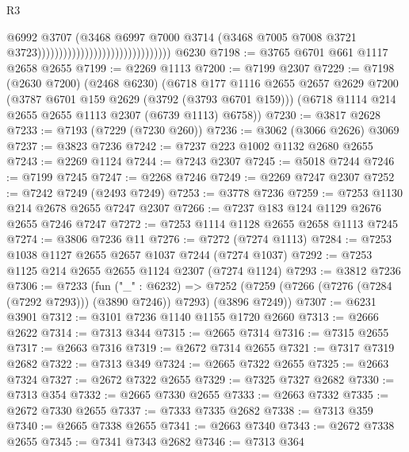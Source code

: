 \begin{lexlean}{R3}
\begin{coremodule}
                                                              @6992
                                                              @3707
                                                              (@3468
                                                                @6997
                                                                @7000
                                                                @3714
                                                                (@3468
                                                                  @7005
                                                                  @7008
                                                                  @3721
                                                                  @3723)))))))))))))))))))))))))))))))
    @6230
@7198 := @3765 @6701 @661 @1117 @2658 @2655
@7199 := @2269 @1113
@7200 := @7199 @2307
@7229 := @7198
    (@2630 @7200)
    (@2468 @6230)
    (@6718
      @177
      @1116
      @2655
      @2657
      @2629
      @7200
      (@3787 @6701 @159 @2629 (@3792 (@3793 @6701 @159)))
      (@6718 @1114 @214 @2655 @2655 @1113 @2307 (@6739 @1113) @6758))
@7230 := @3817 @2628
@7233 := @7193 (@7229 (@7230 @260))
@7236 := @3062 (@3066 @2626) @3069
@7237 := @3823 @7236
@7242 := @7237 @223 @1002 @1132 @2680 @2655
@7243 := @2269 @1124
@7244 := @7243 @2307
@7245 := @5018 @7244
@7246 := @7199 @7245
@7247 := @2268 @7246
@7249 := @2269 @7247 @2307
@7252 := @7242 @7249 (@2493 @7249)
@7253 := @3778 @7236
@7259 := @7253 @1130 @214 @2678 @2655 @7247 @2307
@7266 := @7237 @183 @124 @1129 @2676 @2655 @7246 @7247
@7272 := @7253 @1114 @1128 @2655 @2658 @1113 @7245
@7274 := @3806 @7236 @11
@7276 := @7272 (@7274 @1113)
@7284 := @7253 @1038 @1127 @2655 @2657 @1037 @7244 (@7274 @1037)
@7292 := @7253 @1125 @214 @2655 @2655 @1124 @2307 (@7274 @1124)
@7293 := @3812 @7236
@7306 := @7233
    (fun ("_" : @6232) =>
    @7252 (@7259 (@7266 (@7276 (@7284 (@7292 @7293))) (@3890 @7246)) @7293) (@3896 @7249))
@7307 := @6231 @3901
@7312 := @3101 @7236 @1140 @1155 @1720 @2660
@7313 := @2666 @2622
@7314 := @7313 @344
@7315 := @2665 @7314
@7316 := @7315 @2655
@7317 := @2663 @7316
@7319 := @2672 @7314 @2655
@7321 := @7317 @7319 @2682
@7322 := @7313 @349
@7324 := @2665 @7322 @2655
@7325 := @2663 @7324
@7327 := @2672 @7322 @2655
@7329 := @7325 @7327 @2682
@7330 := @7313 @354
@7332 := @2665 @7330 @2655
@7333 := @2663 @7332
@7335 := @2672 @7330 @2655
@7337 := @7333 @7335 @2682
@7338 := @7313 @359
@7340 := @2665 @7338 @2655
@7341 := @2663 @7340
@7343 := @2672 @7338 @2655
@7345 := @7341 @7343 @2682
@7346 := @7313 @364

\end{coremodule}
\end{lexlean}
